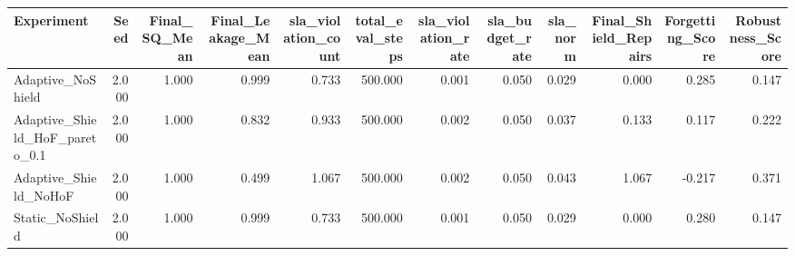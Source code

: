 \begin{tabular}{lrrrrrrrrrrr}
\toprule
Experiment & Seed & Final_SQ_Mean & Final_Leakage_Mean & sla_violation_count & total_eval_steps & sla_violation_rate & sla_budget_rate & sla_norm & Final_Shield_Repairs & Forgetting_Score & Robustness_Score \\
\midrule
Adaptive_NoShield & 2.000 & 1.000 & 0.999 & 0.733 & 500.000 & 0.001 & 0.050 & 0.029 & 0.000 & 0.285 & 0.147 \\
Adaptive_Shield_HoF_pareto_0.1 & 2.000 & 1.000 & 0.832 & 0.933 & 500.000 & 0.002 & 0.050 & 0.037 & 0.133 & 0.117 & 0.222 \\
Adaptive_Shield_NoHoF & 2.000 & 1.000 & 0.499 & 1.067 & 500.000 & 0.002 & 0.050 & 0.043 & 1.067 & -0.217 & 0.371 \\
Static_NoShield & 2.000 & 1.000 & 0.999 & 0.733 & 500.000 & 0.001 & 0.050 & 0.029 & 0.000 & 0.280 & 0.147 \\
\bottomrule
\end{tabular}
